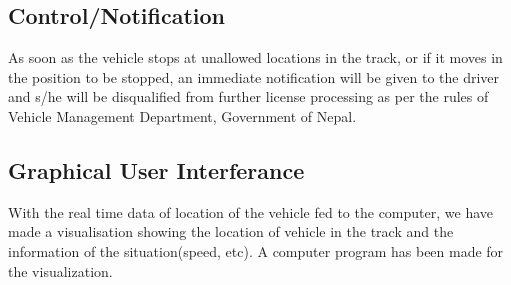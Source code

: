
	\subsection{Control/Notification}
		As soon as the vehicle stops at unallowed locations in the track, or if it moves in the position to be stopped, an immediate notification will be given to the driver and s/he will be disqualified from further license processing as per the rules of Vehicle Management Department, Government of Nepal.

	\subsection{Graphical User Interferance}
		With the real time data of location of the vehicle fed to the computer, we have  made a visualisation showing the location of vehicle in the track and the information of the situation(speed, etc). A computer program has been made for the visualization. 
